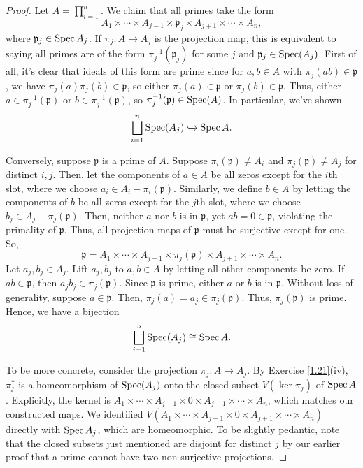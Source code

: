 \begin{proof}
Let $A = \prod_{i=1}^n$. We claim that all primes take the form 
$$A_1 \times \cdots \times A_{j-1} \times \mathfrak{p}_j \times A_{j+1} \times \cdots \times A_n,$$
where $\mathfrak{p}_j \in \operatorname{Spec} A_j$. If $\pi_j : A \to A_j$ is the projection map, this is equivalent to saying all primes are of the form
$\pi_j^{-1}(\mathfrak{p}_j)$ for some $j$ and $\mathfrak{p}_j \in \operatorname{Spec}(A_j)$. First of all, it's clear that ideals of this form 
are prime since for $a,b \in A$ with $\pi_j(ab) \in \mathfrak{p}$, we have $\pi_j(a)\pi_j(b) \in \mathfrak{p}$, so either $\pi_j(a) \in \mathfrak{p}$
or $\pi_j(b) \in \mathfrak{p}$. Thus, either $a \in \pi_j^{-1}(\mathfrak{p})$ or $b \in \pi_j^{-1}(\mathfrak{p})$, so $\pi_j^{-1}(\mathfrak{p}) \in \operatorname{Spec}(A)$.
In particular, we've shown $$\bigsqcup_{i=1}^n \operatorname{Spec}(A_j) \xhookrightarrow{} \operatorname{Spec} A.$$

Conversely, suppose $\mathfrak{p}$ is a prime of $A$. Suppose $\pi_i(\mathfrak{p}) \neq A_i$ and $\pi_j(\mathfrak{p}) \neq A_j$ for distinct $i,j$. Then,
let the components of $a \in A$ be all zeros except for the $i$th slot, where we choose $a_i \in A_i - \pi_i(\mathfrak{p})$. Similarly, we define $b \in A$ by
letting the components of $b$ be all zeros except for the $j$th slot, where we choose $b_j \in A_j - \pi_j(\mathfrak{p})$. Then, neither $a$ nor $b$ is in $\mathfrak{p}$,
yet $ab = 0 \in \mathfrak{p}$, violating the primality of $\mathfrak{p}$. Thus, all projection maps of $\mathfrak{p}$ must be surjective except for one. So,
$$\mathfrak{p} = A_1 \times \cdots \times A_{j-1} \times \pi_j(\mathfrak{p}) \times A_{j+1} \times \cdots \times A_n.$$
Let $a_j,b_j \in A_j$. Lift $a_j,b_j$ to $a,b \in A$ by letting all other components be zero. If $ab \in \mathfrak{p}$, then $a_jb_j \in \pi_j(\mathfrak{p})$. Since
$\mathfrak{p}$ is prime, either $a$ or $b$ is in $\mathfrak{p}$. Without loss of generality, suppose $a \in \mathfrak{p}$. Then, $\pi_j(a) = a_j \in \pi_j(\mathfrak{p})$. Thus,
$\pi_j(\mathfrak{p})$ is prime. Hence, we have a bijection
$$\bigsqcup_{i=1}^n \operatorname{Spec}(A_j) \cong \operatorname{Spec} A.$$

To be more concrete, consider the projection $\pi_j : A \to A_j$. By Exercise \ref{1.21}(iv), $\pi_j^*$ is a homeomorphism of $\operatorname{Spec}(A_j)$ onto the closed subset
$V(\ker \pi_j)$ of $\operatorname{Spec} A$. Explicitly, the kernel is $A_1 \times \cdots \times A_{j-1} \times 0 \times A_{j+1} \times \cdots \times A_n$, which matches
our constructed maps. We identified $V(A_1 \times \cdots \times A_{j-1} \times 0 \times A_{j+1} \times \cdots \times A_n)$ directly with $\operatorname{Spec} A_j$, which are homeomorphic. 
To be slightly pedantic, note that the closed subsets just mentioned are disjoint for distinct $j$ by our earlier proof that a prime cannot have two non-surjective projections.
\end{proof}

